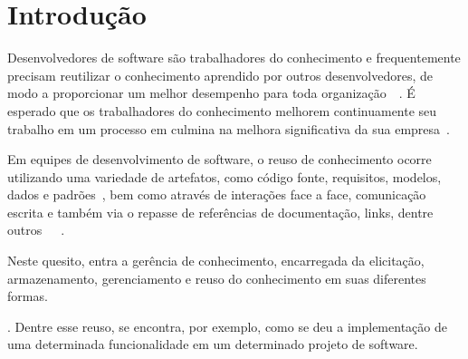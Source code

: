 \chapter{Introdução}

Desenvolvedores de software são trabalhadores do conhecimento e frequentemente precisam reutilizar o conhecimento aprendido por outros desenvolvedores, de modo a proporcionar um melhor desempenho para toda organização~\cite{Druker1993}~\cite{Wiig2003}.
É esperado que os trabalhadores do conhecimento melhorem  continuamente seu trabalho em um processo em culmina na melhora significativa da sua empresa~\cite{Kavitha2011}.


Em equipes de desenvolvimento de software, o reuso de conhecimento ocorre utilizando uma variedade de artefatos, como código fonte, requisitos, modelos, dados e padrões~\cite{Levy2009}, bem como através de interações face a face, comunicação escrita e também via o repasse de referências de documentação, links, dentre outros~\cite{Storey2014}~\cite{Olson2000}~\cite{CubraniC2004}.

Neste quesito, entra a gerência de conhecimento, encarregada da elicitação, armazenamento, gerenciamento e reuso do conhecimento em suas diferentes formas.
.
Dentre esse reuso, se encontra, por exemplo, como se deu a implementação de uma determinada funcionalidade em um determinado projeto de software.



